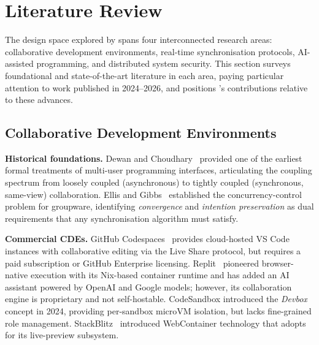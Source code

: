 \section{Literature Review}
\label{sec:litreview}

The design space explored by \echoray{} spans four interconnected research
areas: collaborative development environments, real-time synchronisation
protocols, AI-assisted programming, and distributed system security.
This section surveys foundational and state-of-the-art literature in each
area, paying particular attention to work published in 2024--2026, and
positions \echoray{}'s contributions relative to these advances.

\subsection{Collaborative Development Environments}
\label{sub:cde}

\textbf{Historical foundations.}
Dewan and Choudhary~\cite{dewan1995flexible} provided one of the earliest
formal treatments of multi-user programming interfaces, articulating the
coupling spectrum from loosely coupled (asynchronous) to tightly coupled
(synchronous, same-view) collaboration. Ellis and
Gibbs~\cite{ellis1989concurrency} established the concurrency-control problem
for groupware, identifying \emph{convergence} and \emph{intention preservation}
as dual requirements that any synchronisation algorithm must satisfy.

\textbf{Commercial CDEs.}
GitHub Codespaces~\cite{githubcodespaces2023} provides cloud-hosted VS Code
instances with collaborative editing via the Live Share protocol, but requires
a paid subscription or GitHub Enterprise licensing. Replit~\cite{replit2024}
pioneered browser-native execution with its Nix-based container runtime and
has added an AI assistant powered by OpenAI and Google models; however, its
collaboration engine is proprietary and not self-hostable. CodeSandbox
\cite{codesandbox2023} introduced the \textit{Devbox} concept in 2024,
providing per-sandbox microVM isolation, but lacks fine-grained role management.
StackBlitz~\cite{stackblitz2023} introduced WebContainer technology that
\echoray{} adopts for its live-preview subsystem.

